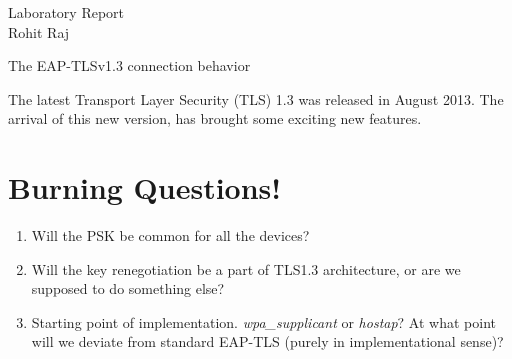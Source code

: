 \documentclass[12pt]{article}
\begin{document}

\begin{center}
    Laboratory Report \\
    Rohit Raj
\end{center}

\begin{center}
    \Large The EAP-TLSv1.3 connection behavior
\end{center}

The latest Transport Layer Security (TLS) 1.3 was released in August 2013. The arrival of this new version, has brought some exciting new features. 

\section{Burning Questions!}

\begin{enumerate}
	\item{Will the PSK be common for all the devices?}
	\item{Will the key renegotiation be a part of TLS1.3 architecture, or are we supposed to do something else?}
	\item{Starting point of implementation. \emph{wpa\_supplicant} or \emph{hostap}? At what point will we deviate from standard EAP-TLS (purely in implementational sense)?}
	
\end{enumerate}
\end{document}

